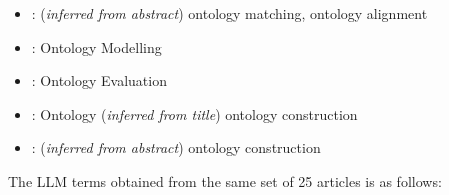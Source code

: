 \documentclass[a4paper,colorinlistoftodos]{article}
\begin{document}
\begin{itemize}
  \item \citet{snijder2024AdvancingOntologyAlignment}: (\textit{inferred from
      abstract}) ontology matching, ontology alignment
  \item \citet{fathallah2024NeonGptLarge}: Ontology Modelling
  \item \citet{tsaneva2024LlmDrivenOntology}: Ontology Evaluation
  \item \citet{yang2024LlmSupportedApproach}: Ontology (\textit{inferred from
      title}) ontology construction
  \item \citet{zeginis2024ApplyingOntologyAware}: (\textit{inferred from
      abstract}) ontology construction
\end{itemize}

The LLM terms obtained from the same set of 25 articles is as follows:
\end{document}
